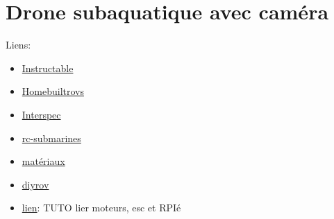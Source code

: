 \documentclass[11pt,a4paper]{article}
\begin{document}
%   
%     
%     
%     


  
  
  \section{Drone subaquatique avec caméra}
    Liens:
    \begin{itemize}
      \item \href{http://www.instructables.com/id/Underwater-ROV/?ALLSTEPS}{Instructable}
      \item \href{http://www.homebuiltrovs.com}{Homebuiltrovs}
      \item \href{http://www.interspec.org/}{Interspec}
      \item \href{http://www.rc-submarines.net/}{rc-submarines}
      \item \href{http://www.mcmaster.com}{matériaux}
      \item \href{http://www.diyrov.net/}{diyrov}
      \item \href{http://stephane.lavirotte.com/perso/rov/esc_brushless_raspberry.html}{lien}: TUTO lier moteurs, esc et RPIé
    \end{itemize}
 
\end{document}
